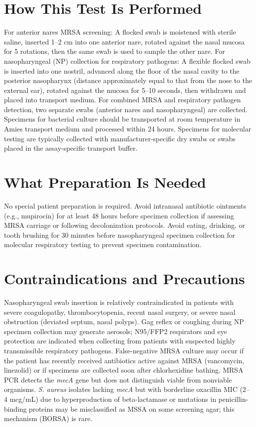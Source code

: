 \section*{How This Test Is Performed}
For anterior nares MRSA screening: A flocked swab is moistened with sterile saline, inserted 1--2 cm into one anterior nare, rotated against the nasal mucosa for 5 rotations, then the same swab is used to sample the other nare. For nasopharyngeal (NP) collection for respiratory pathogens: A flexible flocked swab is inserted into one nostril, advanced along the floor of the nasal cavity to the posterior nasopharynx (distance approximately equal to that from the nose to the external ear), rotated against the mucosa for 5--10 seconds, then withdrawn and placed into transport medium. For combined MRSA and respiratory pathogen detection, two separate swabs (anterior nares and nasopharyngeal) are collected. Specimens for bacterial culture should be transported at room temperature in Amies transport medium and processed within 24 hours. Specimens for molecular testing are typically collected with manufacturer-specific dry swabs or swabs placed in the assay-specific transport buffer.

\section*{What Preparation Is Needed}
No special patient preparation is required. Avoid intranasal antibiotic ointments (e.g., mupirocin) for at least 48 hours before specimen collection if assessing MRSA carriage or following decolonization protocols. Avoid eating, drinking, or tooth brushing for 30 minutes before nasopharyngeal specimen collection for molecular respiratory testing to prevent specimen contamination.

\section*{Contraindications and Precautions}
Nasopharyngeal swab insertion is relatively contraindicated in patients with severe coagulopathy, thrombocytopenia, recent nasal surgery, or severe nasal obstruction (deviated septum, nasal polyps). Gag reflex or coughing during NP specimen collection may generate aerosols; N95/FFP2 respirators and eye protection are indicated when collecting from patients with suspected highly transmissible respiratory pathogens. False-negative MRSA culture may occur if the patient has recently received antibiotics active against MRSA (vancomycin, linezolid) or if specimens are collected soon after chlorhexidine bathing. MRSA PCR detects the \textit{mecA} gene but does not distinguish viable from nonviable organisms. \textit{S. aureus} isolates lacking \textit{mecA} but with borderline oxacillin MIC (2--4 mcg/mL) due to hyperproduction of beta-lactamase or mutations in penicillin-binding proteins may be misclassified as MSSA on some screening agar; this mechanism (BORSA) is rare.

